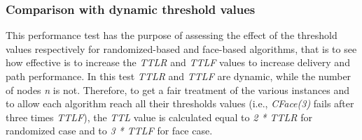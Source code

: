 \documentclass[journal,comsoc]{IEEEtran}
\begin{document}
\subsubsection{Comparison with dynamic threshold values}
This performance test has the purpose of assessing the effect of the threshold values respectively for randomized-based and face-based algorithms, that is to see how effective is to increase the \emph{TTLR} and \emph{TTLF} values to increase delivery and path performance. In this test \emph{TTLR} and \emph{TTLF} are dynamic, while the number of nodes \emph{n} is not. Therefore, to get a fair treatment of the various instances and to allow each algorithm reach all their thresholds values (i.e., \emph{CFace(3)} fails after three times \emph{TTLF}), the \emph{TTL} value is calculated equal to \emph{2 * TTLR} for randomized case and to \emph{3 * TTLF} for face case.\\


\begin{figure}[!t]
\centering
{}

\end{figure}
\end{document}
